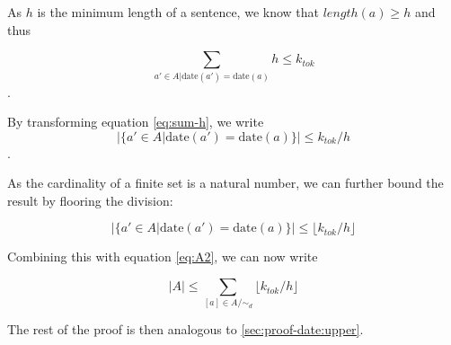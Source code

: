 \documentclass[a4paper,BCOR=10mm]{report}
\numberwithin{lemma}{chapter}
\numberwithin{definition}{chapter}
\begin{document}
\begin{appendices}
As $h$ is the minimum length of a sentence, we know that $\mathit{length}(a) \geq h$ and thus

\begin{equation}
\sum_{ a' \in A | \text{date}(a') = \text{date}(a)} h \leq k_{tok} \label{eq:sum-h}
\end{equation}.

By transforming equation \ref{eq:sum-h}, we write
\begin{equation}
|\{ a' \in A | \text{date}(a') = \text{date}(a)\}| \leq k_{tok}/h
\end{equation}.

As the cardinality of a finite set is a natural number, we can further bound the result by flooring the division:

\begin{equation}
|\{ a' \in A | \text{date}(a') = \text{date}(a)\}| \leq \lfloor k_{tok}/h \rfloor
\end{equation}


Combining this with equation \ref{eq:A2}, we can now write

\begin{equation}
|A| \leq \sum_{[a] \in A/\sim_d} \lfloor k_{tok}/h \rfloor
\end{equation}

The rest of the proof is then analogous to \ref{sec:proof-date:upper}.




\end{appendices}
\end{document}
